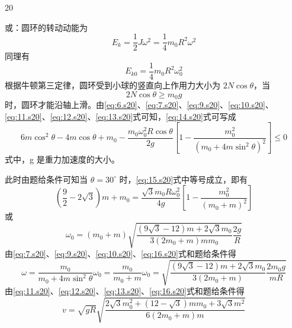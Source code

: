 \begin{solution}{20}
\begin{subsolution}
\begin{equation}
            \label{eq:12.s20}
        \end{equation}
        或：圆环的转动动能为
        \begin{equation*}
            E_k = \frac{1}{2}J\omega^2 = \frac{1}{4}m_0 R^2 \omega^2
        \end{equation*}
        同理有
        \begin{equation}
            E_{k0} = \frac{1}{4}m_0 R^2 \omega_0^2
            \label{eq:13.s20}
        \end{equation}
        根据牛顿第三定律，圆环受到小球的竖直向上作用力大小为 $2N\cos\theta$，当
        \begin{equation}
            2N\cos\theta \geq m_0 g
            \label{eq:14.s20}
        \end{equation}
        时，圆环才能沿轴上滑。由\eqref{eq:6.s20}、\eqref{eq:7.s20}、\eqref{eq:9.s20}、\eqref{eq:10.s20}、\eqref{eq:11.s20}、\eqref{eq:12.s20}、\eqref{eq:13.s20}式可知，\eqref{eq:14.s20}式可写成
        \begin{equation}
            6m\cos^2\theta - 4m\cos\theta + m_0 - \frac{m_0 \omega_0^2 R \cos\theta}{2g}\left[1 - \frac{m_0^2}{(m_0 + 4m\sin^2\theta)^2}\right] \leq 0
            \label{eq:15.s20}
        \end{equation}
        式中，g 是重力加速度的大小。
    \end{subsolution}
    \begin{subsolution}
        此时由题给条件可知当 $\theta = 30^{\circ}$ 时，\eqref{eq:15.s20}式中等号成立，即有
        \begin{equation*}
            \left(\frac{9}{2} - 2\sqrt{3}\right)m + m_0 = \frac{\sqrt{3}m_0 R \omega_0^2}{4g}\left[1 - \frac{m_0^2}{(m_0 + m)^2}\right]
        \end{equation*}
        或
        \begin{equation}
            \omega_0 = (m_0 + m)\sqrt{\frac{(9\sqrt{3} - 12)m + 2\sqrt{3}m_0}{3(2m_0 + m)m m_0}\frac{2g}{R}}
            \label{eq:16.s20}
        \end{equation}
        由\eqref{eq:7.s20}、\eqref{eq:9.s20}、\eqref{eq:10.s20}、\eqref{eq:16.s20}式和题给条件得
        \begin{equation}
            \omega = \frac{m_0}{m_0 + 4m\sin^2\theta}\omega_0 = \frac{m_0}{m_0 + m}\omega_0 = \sqrt{\frac{(9\sqrt{3} - 12)m + 2\sqrt{3}m_0}{3(2m_0 + m)}\frac{2m_0 g}{mR}}
            \label{eq:17.s20}
        \end{equation}
        由\eqref{eq:11.s20}、\eqref{eq:12.s20}、\eqref{eq:13.s20}、\eqref{eq:16.s20}式和题给条件得
        \begin{equation}
            v = \sqrt{gR}\sqrt{\frac{2\sqrt{3}m_0^2 + (12 - \sqrt{3})m m_0 + 3\sqrt{3}m^2}{6(2m_0 + m)m}}
            \label{eq:18.s20}
        \end{equation}
    \end{subsolution}
\end{solution}